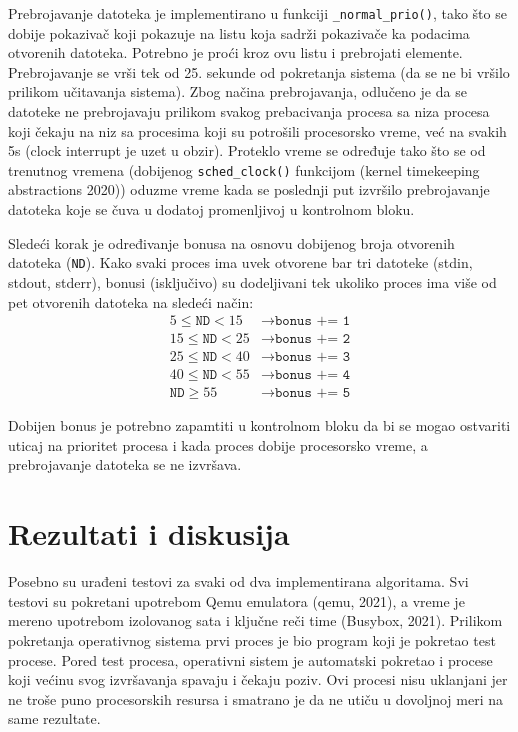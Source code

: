 Prebrojavanje datoteka je implementirano u funkciji \verb|_normal_prio()|, tako što se
dobije pokazivač koji pokazuje na listu koja sadrži
pokazivače ka podacima otvorenih datoteka. Potrebno je proći kroz ovu listu i prebrojati
elemente. Prebrojavanje se vrši tek od 25. sekunde od pokretanja sistema (da se ne bi vršilo
prilikom učitavanja sistema). Zbog načina prebrojavanja, odlučeno je da se datoteke ne
prebrojavaju prilikom svakog prebacivanja procesa sa niza procesa koji čekaju na niz sa
procesima koji su potrošili procesorsko vreme, već na svakih 5s (clock interrupt je uzet u
obzir). Proteklo vreme se određuje tako što se od trenutnog vremena (dobijenog
\verb|sched_clock()| funkcijom (kernel timekeeping abstractions 2020)) oduzme vreme kada
se poslednji put izvršilo prebrojavanje datoteka koje se čuva u dodatoj promenljivoj u
kontrolnom bloku.

Sledeći korak je određivanje bonusa na osnovu dobijenog broja otvorenih datoteka (\texttt{ND}). Kako
svaki proces ima uvek otvorene bar tri datoteke (stdin, stdout, stderr), bonusi (isključivo) su
dodeljivani tek ukoliko proces ima više od pet otvorenih datoteka na sledeći način:
\begin{align*}
    5 \leq \texttt{ND} < 15 &\rightarrow \texttt{bonus += 1} \\
    15 \leq \texttt{ND} < 25 &\rightarrow \texttt{bonus += 2} \\
    25 \leq \texttt{ND} < 40 &\rightarrow \texttt{bonus += 3} \\
    40 \leq \texttt{ND} < 55 &\rightarrow \texttt{bonus += 4} \\ 
    \texttt{ND} \geq 55 &\rightarrow \texttt{bonus += 5}
\end{align*}

Dobijen bonus je potrebno zapamtiti u kontrolnom bloku da bi se mogao ostvariti uticaj na
prioritet procesa i kada proces dobije procesorsko vreme, a prebrojavanje datoteka se ne
izvršava.

\section{Rezultati i diskusija}

Posebno su urađeni testovi za svaki od dva implementirana algoritama. Svi testovi su
pokretani upotrebom Qemu emulatora (qemu, 2021), a vreme je mereno upotrebom
izolovanog sata i ključne reči time (Busybox, 2021). Prilikom pokretanja operativnog
sistema prvi proces je bio program koji je pokretao test procese. Pored test procesa,
operativni sistem je automatski pokretao i procese koji većinu svog izvršavanja spavaju i
čekaju poziv. Ovi procesi nisu uklanjani jer ne troše puno procesorskih resursa i smatrano je
da ne utiču u dovoljnoj meri na same rezultate.

